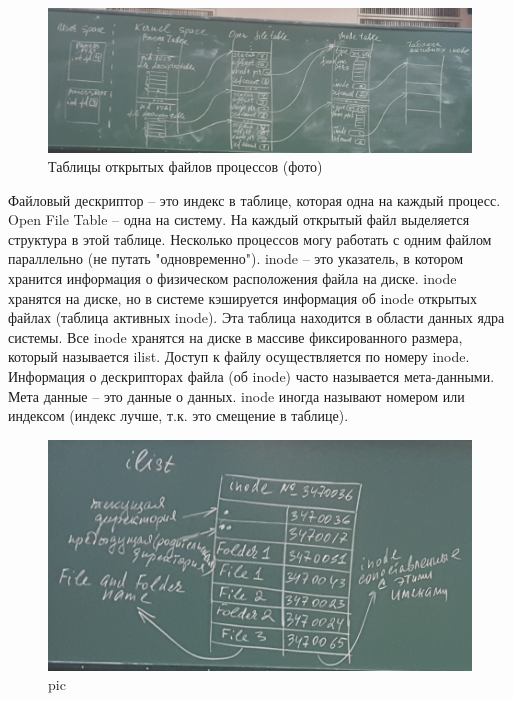 \begin{figure}[H]
  \centering
  \includegraphics[width=\textwidth]{pic/3.png}
  \caption{Таблицы открытых файлов процессов (фото)}
\end{figure}

Файловый дескриптор – это индекс в таблице, которая одна на каждый процесс. 
Open File Table – одна на систему.  На каждый открытый файл выделяется структура в этой таблице. 
Несколько процессов могу работать с одним файлом параллельно (не путать "одновременно"). 
inode – это указатель, в котором хранится информация о физическом расположения файла на диске. inode хранятся на диске, но в системе кэшируется информация об inode открытых файлах (таблица активных inode). Эта таблица находится в области данных ядра системы.
Все inode хранятся на диске в массиве фиксированного размера, который называется ilist.
Доступ к файлу осуществляется по номеру inode. Информация о дескрипторах файла (об inode) часто называется мета-данными. Мета данные – это данные о данных.
inode иногда называют номером или индексом (индекс лучше, т.к. это смещение в таблице).

\begin{figure}[H]
  \centering
  \includegraphics[width=\textwidth]{pic/4.png}
  \caption{pic}
\end{figure}

